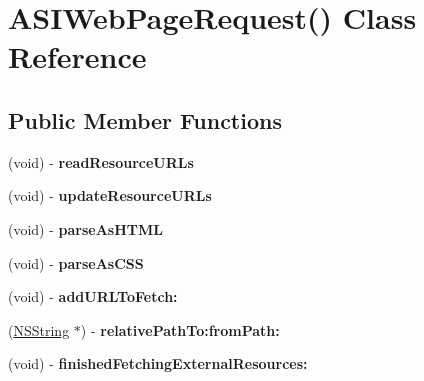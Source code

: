 \hypertarget{interface_a_s_i_web_page_request_07_08}{
\section{\-A\-S\-I\-Web\-Page\-Request() \-Class \-Reference}
\label{interface_a_s_i_web_page_request_07_08}
}
\subsection*{\-Public \-Member \-Functions}
\begin{DoxyCompactItemize}
\item 
\hypertarget{interface_a_s_i_web_page_request_07_08_ab24b21394db3a5dd2e5b8106f02d90cb}{
(void) -\/ {\bfseries read\-Resource\-U\-R\-Ls}}
\label{interface_a_s_i_web_page_request_07_08_ab24b21394db3a5dd2e5b8106f02d90cb}

\item 
\hypertarget{interface_a_s_i_web_page_request_07_08_a48cb9170f0da665365bd71ce45218bef}{
(void) -\/ {\bfseries update\-Resource\-U\-R\-Ls}}
\label{interface_a_s_i_web_page_request_07_08_a48cb9170f0da665365bd71ce45218bef}

\item 
\hypertarget{interface_a_s_i_web_page_request_07_08_a32e4f9527c5576ec2c149e1d1bd4a450}{
(void) -\/ {\bfseries parse\-As\-H\-T\-M\-L}}
\label{interface_a_s_i_web_page_request_07_08_a32e4f9527c5576ec2c149e1d1bd4a450}

\item 
\hypertarget{interface_a_s_i_web_page_request_07_08_ab76a7526b183c203e4830006647643f4}{
(void) -\/ {\bfseries parse\-As\-C\-S\-S}}
\label{interface_a_s_i_web_page_request_07_08_ab76a7526b183c203e4830006647643f4}

\item 
\hypertarget{interface_a_s_i_web_page_request_07_08_ad529f9fc61a74358e70f39a51735bc50}{
(void) -\/ {\bfseries add\-U\-R\-L\-To\-Fetch\-:}}
\label{interface_a_s_i_web_page_request_07_08_ad529f9fc61a74358e70f39a51735bc50}

\item 
\hypertarget{interface_a_s_i_web_page_request_07_08_a2011108575f71f9a2cf29da91274aa88}{
(\hyperlink{class_n_s_string}{\-N\-S\-String} $\ast$) -\/ {\bfseries relative\-Path\-To\-:from\-Path\-:}}
\label{interface_a_s_i_web_page_request_07_08_a2011108575f71f9a2cf29da91274aa88}

\item 
\hypertarget{interface_a_s_i_web_page_request_07_08_af714458ef6836f9e96cd7917ffd3a108}{
(void) -\/ {\bfseries finished\-Fetching\-External\-Resources\-:}}
\label{interface_a_s_i_web_page_request_07_08_af714458ef6836f9e96cd7917ffd3a108}


\end{DoxyCompactItemize}
